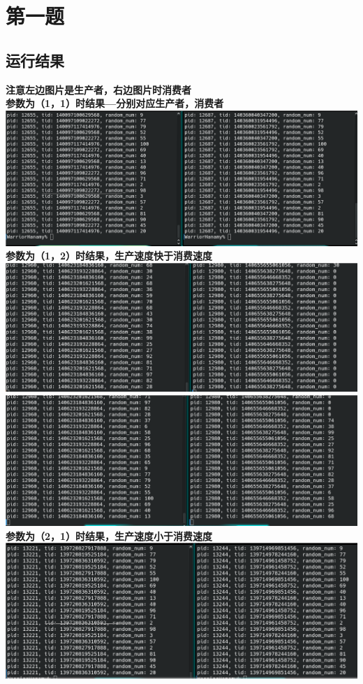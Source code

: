 \documentclass{article}
\begin{document}
\section*{第一题}
\subsection{运行结果}
\label{subsec:label}
\textbf{注意左边图片是生产者，右边图片时消费者}\\
\textbf{参数为（1，1）时结果---分别对应生产者，消费者}\\
\includegraphics[scale=0.35]{11.png}
\textbf{参数为（1，2）时结果，生产速度快于消费速度}\\
\includegraphics[scale=0.35]{12.png}
\includegraphics[scale=0.35]{12-2.png}
\textbf{参数为（2，1）时结果，生产速度小于消费速度}\\
\includegraphics[scale=0.35]{21.png}
\end{document}
